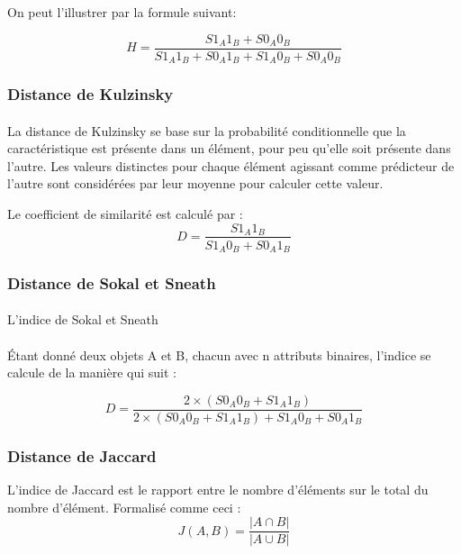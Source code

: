 \documentclass[a4paper, 12pt, twoside]{article}
\begin{document}
On peut l’illustrer par la formule suivant:

\begin{equation}
   H = \frac{S1_{A}1_{B}+S0_{A}0_{B}}{S1_{A}1_{B} + S0_{A}1_{B}+S1_{A}0_{B} + S0_{A}0_{B}}
\end{equation}


\subsubsection{Distance de Kulzinsky}
\paragraph{}
La distance de Kulzinsky se base sur la probabilité conditionnelle que la caractéristique est présente dans un élément, pour peu qu'elle soit présente dans l'autre. Les valeurs distinctes pour chaque élément agissant comme prédicteur de l'autre sont considérées par leur moyenne pour calculer cette valeur.

Le coefficient de similarité est calculé par :
\begin{equation}
   D = \frac{S1_{A}1_{B}}{S1_{A}0_{B} + S0_{A}1_{B}}
\end{equation}

\subsubsection{Distance de Sokal et Sneath}
\paragraph{}
L'indice de Sokal et Sneath 
\paragraph{}
\'{E}tant donné deux objets A et B, chacun avec n attributs binaires, l’indice se calcule de la manière qui suit :

\begin{equation}
   D = \frac{2\times(S0_{A}0_{B}+S1_{A}1_{B})}{2\times(S0_{A}0_{B} + S1_{A}1_{B})+S1_{A}0_{B} + S0_{A}1_{B}}
\end{equation}

\subsubsection{Distance de Jaccard}

L'indice de Jaccard est le rapport entre le nombre d'éléments sur le total du nombre d'élément. Formalisé comme ceci :
\begin{equation}
   J( A, B)= \frac{|A \cap B|}{|A \cup B|}
\end{equation}
\end{document}
